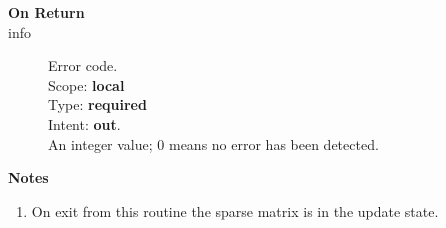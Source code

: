 \begin{description}
\item[\bf On Return]
\item[info] Error code.\\
Scope: {\bf local} \\
Type: {\bf required} \\
Intent: {\bf out}.\\
An integer value; 0 means no error has been detected. 
\end{description}
{\par\noindent\large\bfseries Notes}
\begin{enumerate}
\item On exit from this routine the sparse matrix is in the update
  state. 
\end{enumerate}
%
%





